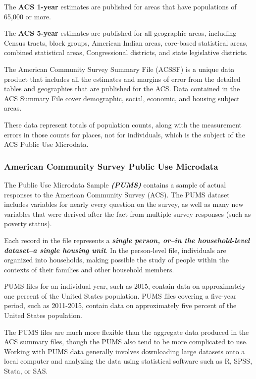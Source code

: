 \documentclass[]{article}
\begin{document}
The \textbf{ACS 1-year} estimates are published for areas that have
populations of 65,000 or more.

The \textbf{ACS 5-year} estimates are published for all geographic
areas, including Census tracts, block groups, American Indian areas,
core-based statistical areas, combined statistical areas, Congressional
districts, and state legislative districts.

The American Community Survey Summary File (ACSSF) is a unique data
product that includes all the estimates and margins of error from the
detailed tables and geographies that are published for the ACS. Data
contained in the ACS Summary File cover demographic, social, economic,
and housing subject areas.

These data represent totals of population counts, along with the
measurement errors in those counts for places, not for individuals,
which is the subject of the ACS Public Use Microdata.

\subsubsection{American Community Survey Public Use
Microdata}\label{american-community-survey-public-use-microdata}

The Public Use Microdata Sample \textbf{\emph{(PUMS)}} contains a sample
of actual responses to the American Community Survey (ACS). The PUMS
dataset includes variables for nearly every question on the survey, as
well as many new variables that were derived after the fact from
multiple survey responses (such as poverty status).

Each record in the file represents a \textbf{\emph{single person, or--in
the household-level dataset--a single housing unit}}. In the
person-level file, individuals are organized into households, making
possible the study of people within the contexts of their families and
other household members.

PUMS files for an individual year, such as 2015, contain data on
approximately one percent of the United States population. PUMS files
covering a five-year period, such as 2011-2015, contain data on
approximately five percent of the United States population.

The PUMS files are much more flexible than the aggregate data produced
in the ACS summary files, though the PUMS also tend to be more
complicated to use. Working with PUMS data generally involves
downloading large datasets onto a local computer and analyzing the data
using statistical software such as R, SPSS, Stata, or SAS.
\end{document}
